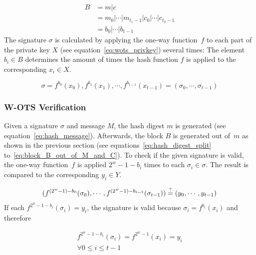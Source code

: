 \begin{align}
\label{eq:block_B_out_of_M_and_C}
B &= m | c  \\ 
&= m_0 | \cdots | m_{t_1 - 1} | c_0 | \cdots | c_{t_2 - 1} \nonumber \\
&= b_0 | \cdots | b_{t-1} \nonumber
\end{align}
The signature $\sigma$ is calculated by applying the one-way function~$f$ to each part of the private key $X$ (see equation~\ref{eq:wots_privkey}) several times: The element $b_i \in B$ determines the amount of times the hash function $f$ is applied to the corresponding $x_i \in X$.

\begin{equation}
\sigma = f^{b_0}(x_0), f^{b_1}(x_1), \cdots, f^{b_{t-1}}(x_{t-1}) = (\sigma_0, \cdots, \sigma_{t-1})
\end{equation}

\subsubsection{W-OTS Verification}
Given a signature $\sigma$ and message $M$, the hash digest $m$ is generated (see equation~\ref{eq:hash_message}). Afterwards, the block $B$ is generated out of~$m$ as shown in the previous section (see equations~\ref{eq:hash_digest_split} to~\ref{eq:block_B_out_of_M_and_C}). To check if the given signature is valid, the one-way function~$f$ is applied $2^w - 1 - b_i$ times to each $\sigma_i \in \sigma$. The result is compared to the corresponding $y_i \in Y$.

\begin{equation}
(f^{(2^w-1)-b_0}(\sigma_0), \cdots, f^{(2^w - 1) - b_{t-1}}(\sigma_{t-1})) \stackrel{?}{=} (y_0, \cdots, y_{t-1})
\end{equation}
If each $f^{2^w-1-b_i}(\sigma_i) = y_i$, the signature is valid because $\sigma_i = f^{b_i}(x_i)$ and therefore

\begin{gather}
f^{2^w-1-b_i}(\sigma_i) = f^{2^w-1}(x_i) = y_i \\
\forall 0 \leq i \leq t-1 \nonumber
\end{gather}



